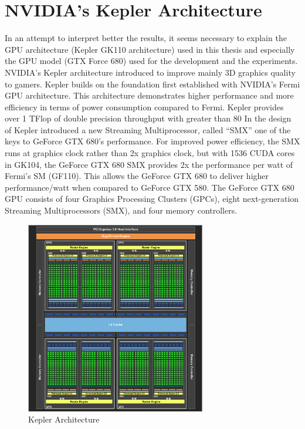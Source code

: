 \section{NVIDIA's Kepler Architecture}
In an attempt to interpret better the results, it seems necessary to explain the GPU architecture (Kepler GK110 architecture) used in this thesis and especially the GPU model (GTX Force 680) used for the development and the experiments.
NVIDIA’s Kepler architecture introduced to improve mainly 3D graphics quality to gamers. Kepler builds on the foundation first established with NVIDIA's Fermi GPU architecture. This architecture demonstrates higher performance and more efficiency in terms of power consumption compared to Fermi. Kepler provides over 1 TFlop of double precision throughput with greater than 80%
 In the design of Kepler introduced a new Streaming Multiprocessor, called “SMX” one of the keys to GeForce GTX 680’s performance. For improved power efficiency, the SMX runs at graphics clock rather than 2x graphics clock, but with 1536 CUDA cores in GK104, the GeForce GTX 680 SMX provides 2x the performance per watt of Fermi’s SM (GF110). This allows the GeForce GTX 680 to deliver higher performance/watt when compared to GeForce GTX 580. The GeForce GTX 680 GPU consists of four Graphics Processing Clusters (GPCs), eight next-generation Streaming Multiprocessors (SMX), and four memory controllers.
 
 
 \begin{figure}[H]
    \centering
        \includegraphics[totalheight=0.5\textheight,width=0.7\textwidth]{kepler.png}
    \caption{Kepler Architecture}
    \label{fig:Kepler}
\end{figure}


